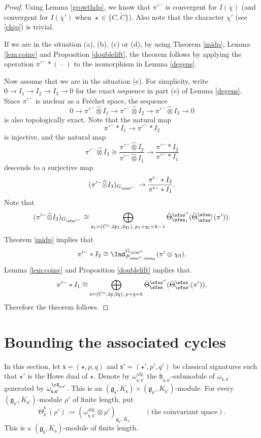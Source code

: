 \documentclass[12pt,a4paper]{amsart}
\newcommand{\g}{\mathfrak g}
\newcommand{\h}{\mathfrak h}
\numberwithin{equation}{section}
\theoremstyle{remark}
\def\Thetab{\bar{\Theta}}
\def\totimes{\widehat{\otimes}}
\begin{document}
\begin{proof}
Using Lemma \ref{growthdp}, we know that $\pi'^-$ is convergent for $I(\dot \chi)$ (and convergent for $I(\dot \chi')$ when $\dot \star\in \{C,\widetilde C\}$). Also note that the character $\chi'$ (see \eqref{chip}) is trivial. 

If we are in the situation (a), (b), (c) or (d), by using Theorem \ref{midp}, Lemma \ref{lem:coinv} and Proposition \ref{doublelift}, the theorem follows by applying the operation $\pi'^-*(\,\cdot\,)$ to the isomorphism in Lemma \ref{degens}. 

Now assume that we are in the situation (e). 
For simplicity, write $0\rightarrow I_1\rightarrow I_2\rightarrow I_3\rightarrow
0$ for the exact sequence in part (e) of Lemma \ref{degens}. Since $\pi'^-$ is nuclear as a Fr\'echet space, the sequence 
\[
0\rightarrow \pi'^-\totimes I_1\rightarrow \pi'^-\totimes I_2\rightarrow \pi'^-\totimes I_3\rightarrow
0
\] 
is also topologically exact. 
Note that the natural map
\[
\pi'^- * I_1\rightarrow \pi'^- * I_2
\]
is injective, and the natural map 
\[
  \pi'^-\totimes I_3\cong \frac{\pi'^-\totimes I_2}{\pi'^- \totimes I_1}\longrightarrow\frac{ \pi'^-*I_2}{\pi'^-*I_1}
  \]
descends to a surjective map
\[
  (\pi'^-\totimes  I_3)_{G_{\sfss'^-}}\rightarrow \frac{ \pi'^-*I_2}{\pi'^-*I_1}.
\]
Note that 
\[
   (\pi'^-\totimes  I_3)_{G_{\sfss'^-}}\cong \bigoplus_{\mathsf s_1=(C^*, 2p_1, 2q_1), \, p_1+q_1=k-1} \check \Theta^{\sfss''}_{\sfss_1}(\check \Theta^{\sfss_1}_{\sfss'}(\pi')).
\]
Theorem \ref{midp} implies that
\[
\pi'^-*I_2\cong \Ind_{P_{\sfss'',\sfss_0}}^{G_{\sfss''}} (\pi'\otimes \chi_0).
\]
Lemma \ref{lem:coinv} and Proposition \ref{doublelift} implies that. 
\[
\pi'^-*I_1\cong  \bigoplus_{\mathsf s=(C^*, 2p, 2q), \, p+q=k}  \Thetab^{\sfss''}_{\sfss}(\Thetab^{\sfss}_{\sfss'}(\pi')).
\]
Therefore the theorem follows.
\end{proof}





\section{Bounding the associated  cycles}\label{sec:AC}

In this section, let $\mathsf s=(\star, p,q)$ and $ \mathsf s'=(\star', p',q')$ be classical signatures such that $\star'$ is the Howe dual of $\star$.
Denote by $\omega^{\mathrm{alg}}_{\mathsf s, \mathsf s'}$ the $\h_{\mathsf s, \mathsf s'}$-submodule of $\omega_{\mathsf s, \mathsf s'}$ generated by  $ \omega_{\mathsf s, \mathsf s'}^{\cX_{\mathsf s, \mathsf s'}}$. This is an $(\g_\mathsf s, K_\mathsf s)\times (\g_{\mathsf s'}, K_{\mathsf s'})$-module. For every $ (\g_{\mathsf s'}, K_{\mathsf s'})$-module $\rho'$ of finite length,
put
\[
   \check \Theta_{\mathsf s'}^{\mathsf s}(\rho'):=(\omega^{\mathrm{alg}}_{\mathsf s, \mathsf s'}\otimes \rho')_{\g_{\mathsf s'}, K_{\mathsf s'}} \qquad (\textrm{the  coinvariant space}).
\]
This is a $(\g_{\mathsf s}, K_{\mathsf s})$-module of finite length.
\end{document}
